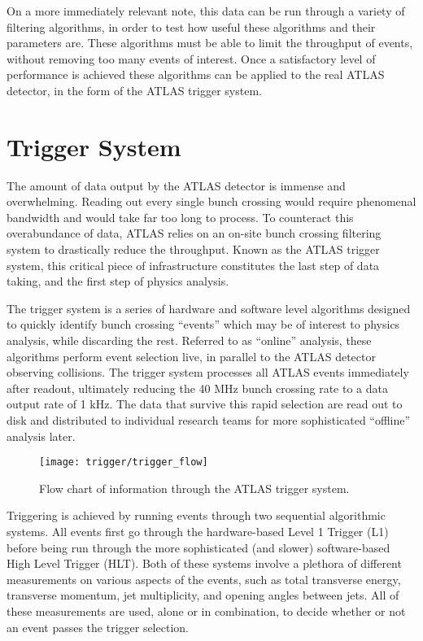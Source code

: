     On a more immediately relevant note, this data can be run through a variety of filtering algorithms,
        in order to test how useful these algorithms and their parameters are.
    These algorithms must be able to limit the throughput of events,
        without removing too many events of interest.
    Once a satisfactory level of performance is achieved these algorithms can be applied to the real ATLAS detector,
        in the form of the ATLAS trigger system.


\section{Trigger System} \label{sec:trigger}

    The amount of data output by the ATLAS detector is immense and overwhelming.
    Reading out every single bunch crossing would require phenomenal bandwidth and would take far too long to process.
    To counteract this overabundance of data, ATLAS relies on an on-site bunch crossing filtering system to drastically reduce the throughput.
    Known as the ATLAS trigger system, this critical piece of infrastructure constitutes the last step of data taking,
        and the first step of physics analysis.

    The trigger system is a series of hardware and software level algorithms designed
        to quickly identify bunch crossing ``events'' which may be of interest to physics analysis,
        while discarding the rest.
    Referred to as ``online'' analysis, these algorithms perform event selection live,
        in parallel to the ATLAS detector observing collisions.
    The trigger system processes all ATLAS events immediately after readout,
        ultimately reducing the 40 MHz bunch crossing rate to a data output rate of 1 kHz.
    The data that survive this rapid selection are read out to disk and distributed to individual research teams for more sophisticated ``offline'' analysis later.

    \begin{figure}[h]
        \texttt{[image: trigger/trigger\_flow]}
        \caption{Flow chart of information through the ATLAS trigger system\cite{trigger_run2}.}
        \label{fig:trigger_flow}
    \end{figure}
    
    Triggering is achieved by running events through two sequential algorithmic systems.
    All events first go through the hardware-based Level 1 Trigger (L1) before being run through the more sophisticated (and slower) software-based High Level Trigger (HLT).
    Both of these systems involve a plethora of different measurements on various aspects of the events, such as total transverse energy, transverse momentum, jet multiplicity, and opening angles between jets.
    All of these measurements are used, alone or in combination, to decide whether or not an event passes the trigger selection.

